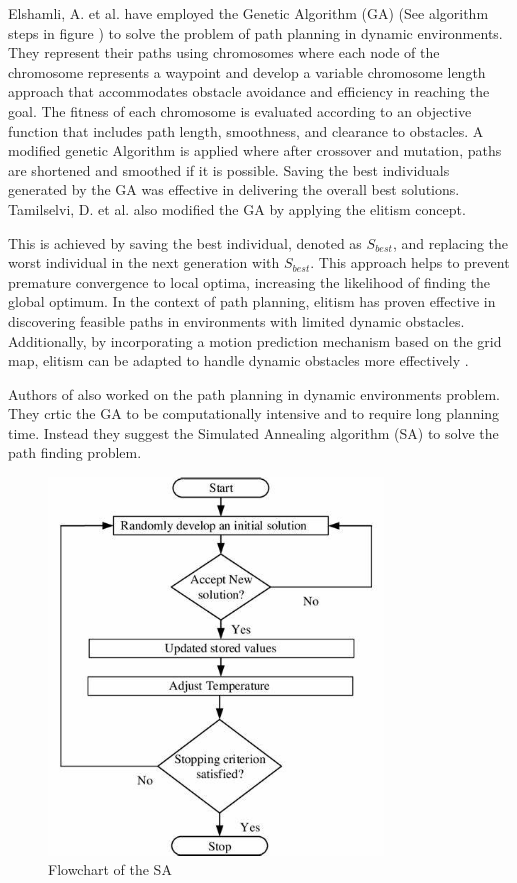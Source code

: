 Elshamli, A. et al. \cite{R17} have employed the Genetic Algorithm (GA) (See algorithm steps in figure ) to solve 
the problem of path planning in dynamic environments. They represent their paths using chromosomes where each node of the chromosome represents 
a waypoint and develop a variable chromosome length approach that accommodates obstacle avoidance and efficiency 
in reaching the goal. The fitness of each chromosome is evaluated according to an objective function that includes path length, smoothness, 
and clearance to obstacles. A modified genetic Algorithm is applied where after crossover and mutation, paths are 
shortened and smoothed if it is possible. Saving the best individuals generated by the GA was effective in delivering the overall best solutions.
Tamilselvi, D. et al. also modified the GA by applying the elitism concept. 

This is achieved by saving the best individual, denoted as \(S_{best}\), and replacing the worst individual in the 
next generation with \(S_{best}\). This approach helps to prevent premature convergence to local optima, increasing 
the likelihood of finding the global optimum. In the context of path planning, elitism has proven effective 
in discovering feasible paths in environments with limited dynamic obstacles. Additionally, by incorporating 
a motion prediction mechanism based on the grid map, elitism can be adapted to handle dynamic obstacles more 
effectively \cite{R38}.

Authors of \cite{R40} also worked on the path planning in dynamic environments problem. They crtic the GA to be computationally
intensive and to require long planning time. Instead they suggest the Simulated Annealing algorithm (SA)
to solve the path finding problem. 

\begin{figure}[H]
    \centering
    \includegraphics[width=3.5in]{images/Chap1/SA.jpg}
    \caption{Flowchart of the SA \cite{R41}}
    \label{SA}
\end{figure}

